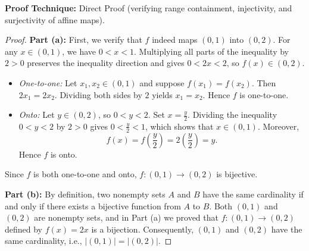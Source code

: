 \documentclass[11pt, letterpaper]{article}
\theoremstyle{definition}
\theoremstyle{remark}
\begin{document}
\textbf{Proof Technique:} Direct Proof (verifying range containment, injectivity, and surjectivity of affine maps).

\begin{proof}
\textbf{Part (a):}
First, we verify that $f$ indeed maps $(0, 1)$ into $(0, 2)$. For any $x \in (0, 1)$, we have $0 < x < 1$. Multiplying all parts of the inequality by $2 > 0$ preserves the inequality direction and gives $0 < 2x < 2$, so $f(x) \in (0, 2)$.
\begin{itemize}
    \item \emph{One-to-one:} Let $x_1, x_2 \in (0, 1)$ and suppose $f(x_1) = f(x_2)$. Then $2x_1 = 2x_2$. Dividing both sides by $2$ yields $x_1 = x_2$. Hence $f$ is one-to-one.
    \item \emph{Onto:} Let $y \in (0, 2)$, so $0 < y < 2$. Set $x = \frac{y}{2}$. Dividing the inequality $0 < y < 2$ by $2 > 0$ gives $0 < \frac{y}{2} < 1$, which shows that $x \in (0, 1)$. Moreover,
    \[
    f(x) = f\!\left(\frac{y}{2}\right) = 2\left(\frac{y}{2}\right) = y.
    \]
    Hence $f$ is onto.
\end{itemize}
Since $f$ is both one-to-one and onto, $f : (0, 1) \to (0, 2)$ is bijective.

\textbf{Part (b):}
By definition, two nonempty sets $A$ and $B$ have the same cardinality if and only if there exists a bijective function from $A$ to $B$. Both $(0, 1)$ and $(0, 2)$ are nonempty sets, and in Part (a) we proved that $f : (0, 1) \to (0, 2)$ defined by $f(x) = 2x$ is a bijection. Consequently, $(0, 1)$ and $(0, 2)$ have the same cardinality, i.e., $|(0, 1)| = |(0, 2)|$.


\end{proof}
\end{document}
